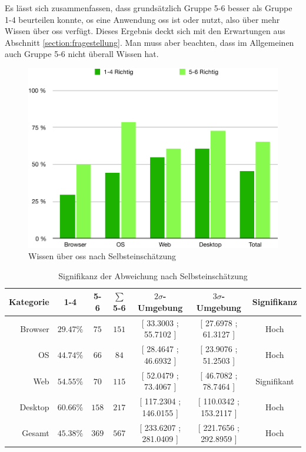 \documentclass[a4paper]{article}
\begin{document}
                    Es lässt sich zusammenfassen, dass grundsätzlich Gruppe 5-6 besser als Gruppe 1-4 beurteilen konnte, os eine Anwendung \gls{oss} ist oder nutzt, also über mehr Wissen über \gls{oss} verfügt. Dieses Ergebnis deckt sich mit den Erwartungen aus Abschnitt \ref{section:fragestellung}. Man muss aber beachten, dass im Allgemeinen auch Gruppe 5-6 nicht überall Wissen hat.
                    
                \begin{figure}
                    \includegraphics[width=\textwidth]{assets/results/openSourceJudging/openSourceJudgingDetailedOSSOnlyByKnowledge.pdf}
                    \caption{Wissen über \gls{oss} nach Selbsteinschätzung}
                    \label{figure:knowledge_by_category_self_assessment}
                \end{figure}
                
                \begin{table}
                    \centering
                    \begin{tabular}{rcccccc}
                        Kategorie & 1-4 & 5-6 & $\sum$ 5-6 & $2\sigma$-Umgebung & $3\sigma$-Umgebung & Signifikanz \\\hline\hline
                        Browser & $29.47\%$ & $75$ & $151$ & \tiny [ 33.3003 ; 55.7102 ] & \tiny [ 27.6978 ; 61.3127 ] & Hoch\\
                        OS & $44.74\%$ & $66$ & $84$ & \tiny  [ 28.4647 ; 46.6932 ]  &  \tiny  [ 23.9076 ; 51.2503 ]  & Hoch\\
                        Web & $54.55\%$ & $70$ & $115$ & \tiny [ 52.0479 ; 73.4067 ] &  \tiny  [ 46.7082 ; 78.7464 ]  &  Signifikant\\
                        Desktop & $60.66\%$ & $158$ & $217$ & \tiny  [ 117.2304 ; 146.0155 ]  & \tiny  [ 110.0342 ; 153.2117 ]  & Hoch\\\hline
                        Gesamt & $45.38\%$ & $369$ & $567$ & \tiny [ 233.6207 ; 281.0409 ] & \tiny  [ 221.7656 ; 292.8959 ] & Hoch
                    \end{tabular}
                    \caption{Signifikanz der Abweichung nach Selbsteinschätzung}
                    \label{table:knowledge_by_category_sigma_self_assessment}
                \end{table}
            
\end{document}
